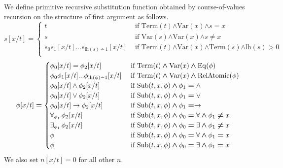\documentclass[10pt]{amsart}
\newcommand{\mand}{\boldsymbol{\wedge}}
\newcommand{\mge}{\boldsymbol{>}}
\newcommand{\meq}{\boldsymbol{=}}
\newcommand{\mneq}{\boldsymbol{\neq}}
\begin{document}
\begin{definition}
	We define primitive recursive substitution function obtained by course-of-values recursion on the structure of first argument as follows.
	$$s[x/t] \meq \begin{cases}
			t                                                & \mbox{ if }\mathrm{Term}(t) \mand \mathrm{Var}(x) \mand s \meq x                                    \\
			s                                                & \mbox{ if }\mathrm{Var}(s) \mand \mathrm{Var}(x) \mand s \mneq x                                    \\
			s_0s_1[x/t]...s_{\mathrm{lh}(s)\dotminus 1}[x/t] & \mbox{ if }\mathrm{Term}(t) \mand \mathrm{Var}(x) \mand \mathrm{Term}(s)\mand \mathrm{lh}(s) \mge 0 \\
		\end{cases}$$
	$$\phi[x/t] \meq \begin{cases}
			\phi_0[x/t] = \phi_2[x/t]                                    & \mbox{ if }\mathrm{Term}(t)\mand \mathrm{Var}(x) \mand \mathrm{Eq}(\phi)        \\
			\phi_0\phi_1[x/t]...\phi_{\mathrm{lh}(\phi)\dotminus 1}[x/t] & \mbox{ if }\mathrm{Term}(t)\mand \mathrm{Var}(x) \mand \mathrm{RelAtomic}(\phi) \\
			\phi_0[x/t]\wedge \phi_2[x/t]                                & \mbox{ if }\mathrm{Sub}(t,x,\phi) \mand \phi_1 \meq \wedge                      \\
			\phi_0[x/t]\vee \phi_2[x/t]                                  & \mbox{ if }\mathrm{Sub}(t,x,\phi) \mand \phi_1 \meq \vee                        \\
			\phi_0[x/t]\ra \phi_2[x/t]                                   & \mbox{ if }\mathrm{Sub}(t,x,\phi) \mand \phi_1 \meq \ra                         \\
			\forall_{\phi_1}\,\phi_2[x/t]                                & \mbox{ if }\mathrm{Sub}(t,x,\phi)\mand \phi_0 \meq \forall \mand \phi_1 \mneq x \\
			\exists_{\phi_1}\,\phi_2[x/t]                                & \mbox{ if }\mathrm{Sub}(t,x,\phi)\mand \phi_0 \meq \exists \mand \phi_1 \mneq x \\
			\phi                                                         & \mbox{ if }\mathrm{Sub}(t,x,\phi)\mand \phi_0 \meq \forall \mand \phi_1 \meq x  \\
			\phi                                                         & \mbox{ if }\mathrm{Sub}(t,x,\phi)\mand \phi_0 \meq \exists \mand \phi_1 \meq x  \\
		\end{cases}$$
	We also set $n[x/t] \meq 0$ for all other $n$.
\end{definition}
\end{document}
